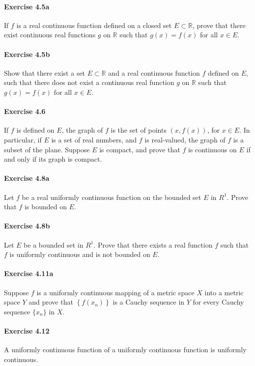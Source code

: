 \documentclass{article}
\begin{document}
\paragraph{Exercise 4.5a} If $f$ is a real continuous function defined on a closed set $E \subset \mathbb{R}$, prove that there exist continuous real functions $g$ on $\mathbb{R}$ such that $g(x)=f(x)$ for all $x \in E$.

\paragraph{Exercise 4.5b} Show that there exist a set $E \subset \mathbb{R}$ and a real continuous function $f$ defined on $E$, such that there does not exist a continuous real function $g$ on $\mathbb{R}$ such that $g(x)=f(x)$ for all $x \in E$.

\paragraph{Exercise 4.6} If $f$ is defined on $E$, the graph of $f$ is the set of points $(x, f(x))$, for $x \in E$. In particular, if $E$ is a set of real numbers, and $f$ is real-valued, the graph of $f$ is a subset of the plane. Suppose $E$ is compact, and prove that $f$ is continuous on $E$ if and only if its graph is compact.

\paragraph{Exercise 4.8a} Let $f$ be a real uniformly continuous function on the bounded set $E$ in $R^{1}$. Prove that $f$ is bounded on $E$.

\paragraph{Exercise 4.8b} Let $E$ be a bounded set in $R^{1}$. Prove that there exists a real function $f$ such that $f$ is uniformly continuous and is not bounded on $E$.

\paragraph{Exercise 4.11a} Suppose $f$ is a uniformly continuous mapping of a metric space $X$ into a metric space $Y$ and prove that $\left\{f\left(x_{n}\right)\right\}$ is a Cauchy sequence in $Y$ for every Cauchy sequence $\{x_n\}$ in $X$.

\paragraph{Exercise 4.12} A uniformly continuous function of a uniformly continuous function is uniformly continuous.
\end{document}

